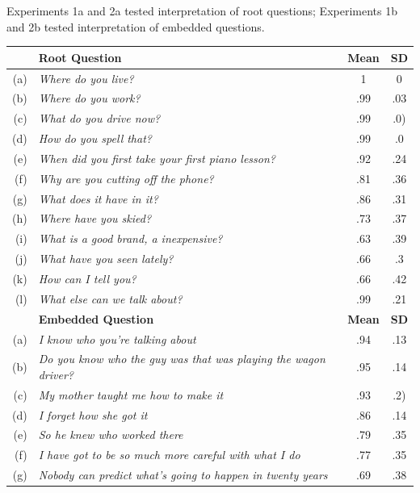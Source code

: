 \documentclass[12pt,letterpaper,table,svgnames,dvipsnames]{article}
\begin{document}
Experiments 1a and 2a tested interpretation of root questions; Experiments 1b and 2b tested interpretation of embedded questions.
\begin{table}[h!]
    \centering
    \begin{tabular}{rlcc}
        \toprule
        {} & \textbf{Root Question} & \textbf{Mean} & \textbf{SD} \\
        \midrule
        (a) & \emph{Where do you live?}       & 1   & 0\\
        (b) & \emph{Where do you work?}       &.99  & .03 \\
        (c) & \emph{What do you drive now?}   &.99    & .0) \\
        (d) & \emph{How do you spell that?}   &.99 &.0\\
        (e) & \emph{When did you first take your first piano lesson?} &.92 & .24 \\
        (f) & \emph{Why are you cutting off the phone?} & .81 & .36\\
        \midrule
        (g) & \emph{What does it have in it?} & .86 & .31 \\
        (h) & \emph{Where have you skied?} &.73 & .37 \\
        \midrule
        (i) & \emph{What is a good brand, a inexpensive?} & .63 & .39\\
        (j) & \emph{What have you seen lately?} & .66 & .3\\
        (k) & \emph{How can I tell you?} & .66 & .42 \\
        (l) & \emph{What else can we talk about?} & .99 & .21\\
        \midrule
        {} & \textbf{Embedded Question} & \textbf{Mean} & \textbf{SD} \\
        \midrule
        (a) & \emph{I know who you’re talking about}       & .94   & .13\\
        (b) & \emph{Do you know who the guy was that was playing the wagon driver?}       &.95  & .14 \\
        (c) & \emph{My mother taught me how to make it}   &.93    & .2) \\
        (d) & \emph{I forget how she got it}   &.86 &.14\\
        \midrule
        (e) & \emph{So he knew who worked there} & .79 & .35 \\
        (f) & \emph{I have got to be so much more careful with what I do} &.77 & .35 \\
        (g) & \emph{Nobody can predict what's going to happen in twenty years} & .69 & .38\\

\end{tabular}
\end{table}
\end{document}

